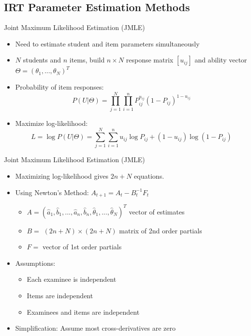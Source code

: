 \documentclass{beamer}
\theoremstyle{definition}
\begin{document}
\subsection{IRT Parameter Estimation Methods}

\begin{frame}{Joint Maximum Likelihood Estimation (JMLE)}
\begin{itemize}
  \item Need to estimate student and item parameters simultaneously
  \item<2-> $N$ students and $n$ items, build $n\times N$ response matrix $[u_{ij}]$ and ability vector $\Theta = (\theta_1,...,\theta_N)^T$
  \item<2-> Probability of item responses:
  \[P(U|\Theta) = \prod_{j=1}^N \prod_{i=1}^n P_{ij}^{u_{ij}} (1-P_{ij})^{1-u_{ij}}\]
  \item<3> Maximize log-likelihood:
  \[L = \log P(U|\Theta) = \sum_{j=1}^N \sum_{i=1}^n u_{ij} \log P_{ij}  + (1-u_{ij}) \log (1-P_{ij})\]
\end{itemize}
\end{frame}

\begin{frame}{Joint Maximum Likelihood Estimation (JMLE)}
\begin{itemize}
  \item Maximizing log-likelihood gives $2n+N$ equations.
  \item Using Newton's Method: $A_{t+1} = A_t - B_t^{-1}F_t$
  \begin{itemize}
    \item $A = (\hat a_1, \hat b_1, ..., \hat a_n, \hat b_n, \hat\theta_1, ..., \hat\theta_N)^T$ vector of estimates 
    \item $B = $ $(2n+N) \times (2n+N)$ matrix of 2nd order partials
    \item $F = $ vector of 1st order partials
  \end{itemize}
  \item<2-> Assumptions:
  \begin{itemize}
    \item<2-> Each examinee is independent
    \item<2-> Items are independent
    \item<2-> Examinees and items are independent
  \end{itemize}
  \item<3> Simplification: Assume most cross-derivatives are zero
\end{itemize}
\end{frame}
\end{document}
